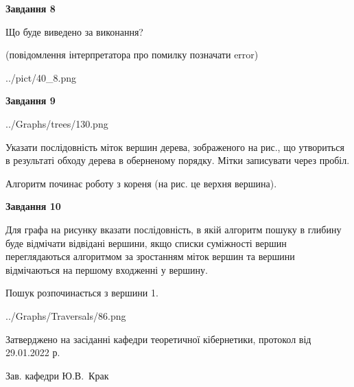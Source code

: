 \documentclass[12pt, ukrainian]{article}
\begin{document}
{\begin {large}
{\begin {center}\textbf{Завдання 8}\end {center}}\par
Що буде виведено за виконання?\par
 (повідомлення інтерпретатора про помилку позначати error)\par
\begin{center}
	{../pict/40_8.png}
\end{center}
\newpage

{\begin {center}\textbf{Завдання 9}\end {center}}\par

\begin{center}
	{../Graphs/trees/130.png}
\end{center}
Указати послідовність міток вершин дерева, зображеного на рис., що утвориться в результаті обходу дерева в оберненому порядку. Мітки записувати через пробіл.\par Алгоритм починає роботу з кореня (на рис. це верхня вершина).\par
\newpage

{\begin {center}\textbf{Завдання 10}\end {center}}\par
Для графа на рисунку вказати послідовність, в якій алгоритм пошуку в глибину буде відмічати відвідані вершини, якщо списки суміжності вершин переглядаються алгоритмом за зростанням міток вершин та вершини відмічаються на першому вход\-женні у вершину.\par
Пошук розпочинається з вершини 1.\par

\begin{center}
	{../Graphs/Traversals/86.png}
\end{center}\par
\newpage


\end {large}
}
{\smallskip \begin {small} Затверджено на засіданні кафедри теоретичної кібернетики, протокол  від   29.01.2022 р.\par\smallskip\smallskip
{\parbox {6.5 cm}{Зав. кафедри \dotfill Ю.В.~Крак}} \end{small}}
\end{document}
